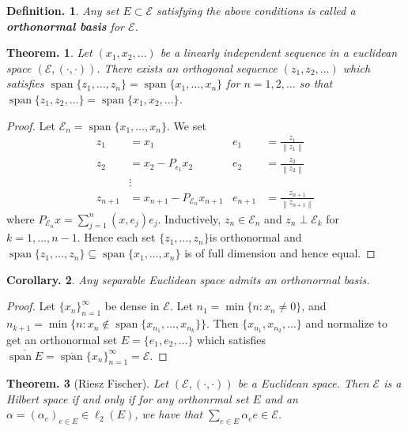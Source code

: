 \documentclass[11pt, a4paper]{memoir}
\newcommand{\norm}[1]{\ensuremath{\left\lVert#1\right\rVert}}
\theoremstyle{change}
\newtheorem{theorem}{Theorem.}[section]
\newtheorem{corollary}[theorem]{Corollary.}
\theoremstyle{plain}
\theoremstyle{nonumberplain}
\newtheorem{definition}{Definition.}
\newtheorem{proof}{Proof}
\DeclareMathOperator{\spn}{span}
\newcommand{\inr}[1]{\ensuremath{\left(#1\right)}}
\numberwithin{equation}{section}
\begin{document}
\begin{definition}
    Any set $E\subset\mathcal{E}$ satisfying the above conditions is called a \textbf{orthonormal basis} for $\mathcal{E}$.
\end{definition}
\begin{theorem}
    Let $(x_1,x_2,\ldots)$ be a linearly independent sequence in a euclidean space $(\mathcal{E},\inr{\cdot,\cdot})$.
    There exists an orthogonal sequence $(z_1,z_2,\ldots)$ which satisfies $\spn\{z_1,\ldots,z_n\}=\spn\{x_1,\ldots,x_n\}$ for $n=1,2,\ldots$ so that $\spn\{z_1,z_2,\ldots\}=\spn\{x_1,x_2,\ldots\}$.
\end{theorem}
\begin{proof}
    Let $\mathcal{E}_n=\spn\{x_1,\ldots,x_n\}$.
    We set
    \begin{align*}
        z_1&=x_1 & e_1 &=\frac{z_1}{\norm{z_1}}\\
        z_2&=x_2-P_{\epsilon_1}x_2 & e_2&=\frac{z_2}{\norm{z_2}}\\
           &\vdots\\
        z_{n+1}&=x_{n+1}-P_{\mathcal{E}_n}x_{n+1} & e_{n+1}&=\frac{z_{n+1}}{\norm{z_{n+1}}}
    \end{align*}
    where $P_{\mathcal{E}_n}x=\sum_{j=1}^n\inr{x,e_j}e_j$.
    Inductively, $z_n\in\mathcal{E}_n$ and $z_n\perp\mathcal{E}_k$ for $k=1,\ldots,n-1$.
    Hence each set $\{z_1,\ldots,z_n\}$is orthonormal and $\spn\{z_1,\ldots,z_n\}\subseteq\spn\{x_1,\ldots,x_n\}$ is of full dimension and hence equal.
\end{proof}
\begin{corollary}
    Any separable Euclidean space admits an orthonormal basis.
\end{corollary}
\begin{proof}
    Let $\{x_n\}_{n=1}^\infty$ be dense in $\mathcal{E}$.
    Let $n_1=\min\{n:x_n\neq 0\}$, and $n_{k+1}=\min\{n:x_n\notin\spn\{x_{n_1},\ldots,x_{n_k}\}\}$.
    Then $\{x_{n_1},x_{n_2},\ldots\}$ and normalize to get an orthonormal set $E=\{e_1,e_2,\ldots\}$ which satisfies $\overline{\spn E}=\overline{\spn}\{x_n\}_{n=1}^\infty=\mathcal{E}$.
\end{proof}
\begin{theorem}[Riesz Fischer]
    Let $(\mathcal{E},\inr{\cdot,\cdot})$ be a Euclidean space.
    Then $\mathcal{E}$ is a Hilbert space if and only if for any orthonrmal set $E$ and an $\alpha=(\alpha_e)_{e\in E}\in\ell_2(E)$, we have that $\sum_{e\in E}\alpha_ee\in\mathcal{E}$.
\end{theorem}
\end{document}
